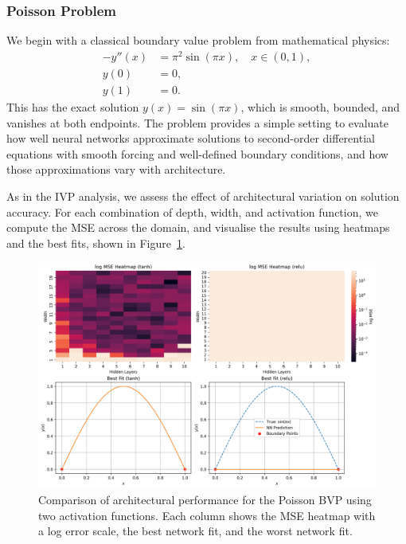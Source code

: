 \subsubsection{Poisson Problem}

We begin with a classical boundary value problem from mathematical physics:
\[
\begin{aligned}
    -y''(x) &= \pi^2 \sin(\pi x), \quad x \in (0, 1), \\
    y(0) &= 0, \\
    y(1) &= 0.
\end{aligned}
\]
This has the exact solution \( y(x) = \sin(\pi x) \), which is smooth, bounded, and vanishes at both 
endpoints. The problem provides a simple setting to evaluate how well neural networks approximate 
solutions to second-order differential equations with smooth forcing and well-defined boundary 
conditions, and how those approximations vary with architecture.

As in the IVP analysis, we assess the effect of architectural variation on solution accuracy.
For each combination of depth, width, and activation function, we compute the MSE across the domain,
and visualise the results using heatmaps and the best fits, shown in 
Figure~\ref{fig:bvp_poisson_sidebyside}.

\begin{figure}[h]
    \centering
    \includegraphics[width=\textwidth]{graphics/bvp_poisson_combined.png}
    \caption{Comparison of architectural performance for the Poisson BVP using two 
    activation functions. Each column shows the MSE heatmap with a log error scale,
    the best network fit, and the worst network fit.}
    \label{fig:bvp_poisson_sidebyside}
\end{figure}

